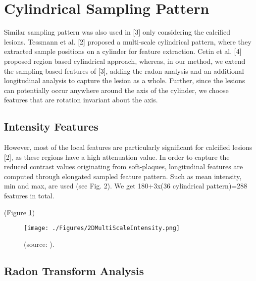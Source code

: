 \section{Cylindrical Sampling Pattern}

Similar sampling pattern was also used in [3] only considering the calcified lesions. Tessmann et al. [2] proposed a multi-scale cylindrical pattern, where they extracted sample positions on a cylinder for feature extraction. Cetin et al. [4] proposed region based cylindrical approach, whereas, in our method, we extend the sampling-based features of [3], adding the radon analysis and an additional longitudinal analysis to capture the lesion as a whole. Further, since the lesions can potentially occur anywhere around the axis of the cylinder, we choose features that are rotation invariant about the axis.

\subsection{Intensity Features}

However, most of the local features are particularly significant for calcified lesions [2], as these regions have a high attenuation value. In order to capture the reduced contrast values originating from soft-plaques, longitudinal features are computed through elongated sampled feature pattern. 
Such as mean intensity, min and max, are used (see Fig. 2). We get 180+3x(36 cylindrical pattern)=288 features in total.

(Figure \ref{fig:2DMultiScaleIntensity})

\begin{figure}[ht]
	\centering
		\texttt{[image: ./Figures/2DMultiScaleIntensity.png]}
	\caption[]{ (source: ).}
	\label{fig:2DMultiScaleIntensity}
\end{figure}


\subsection{Radon Transform Analysis}

